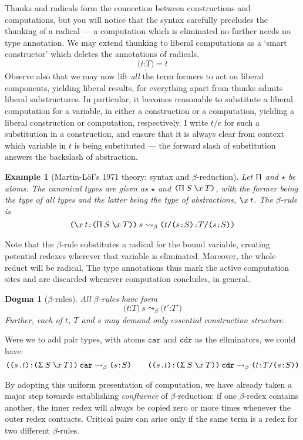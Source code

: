 \documentclass{jfp1}
\newtheorem{dogma}[theorem]{Dogma}
\newtheorem{example}[theorem]{Example}
\newcommand{\fsl}{\texttt{/}}
\newcommand{\Pa}[1]{\texttt{(}#1\texttt{)}}
\newcommand{\dt}{\texttt{.}}
\newcommand{\cn}[2]{\Pa{#1 \dt #2}}
\newcommand{\hb}{\texttt{:}}
\newcommand{\ra}[2]{\Pa{#1 \hb #2}}
\newcommand{\Ne}{\underline}
\begin{document}
Thunks and radicals form the connection between constructions and
computations, but you will notice that the syntax carefully precludes
the thunking of a radical --- a computation which is eliminated no
further needs no type annotation. We may extend thunking to liberal
computations as a `smart constructor' which deletes the annotations
of radicals.
\[
  \Ne{\ra tT} = t
\]
Observe also that we may now lift
\emph{all} the term formers to act on liberal components, yielding
liberal results, for everything apart from thunks admits
liberal substructures. In particular, it becomes reasonable to
substitute a liberal computation for a variable, in either a
construction or a computation, yielding a liberal construction or
computation, respectively. I write $t\fsl e$ for such a substitution
in a construction, and ensure that it is always clear from context
which variable in $t$ is being substituted --- the forward slash
of substitution answers the backslash of abstraction.

\newcommand{\U}{\ensuremath{\star}}

\begin{example}[Martin-L\"of's 1971 theory: syntax and $\beta$-reduction]
  Let $\Uppi$ and $\U$ be atoms. The canonical types are given as
  $\U$ and $\PI SxT$, with the former being the type of all types
  and the latter being the type of abstractions, $\la xt$. The
  $\beta$-rule is
\[
  \ra{\la xt}{\PI SxT}\:s \leadsto_\beta \ra{t\fsl\ra sS}{T\fsl\ra sS}
\]
\end{example}

Note that the $\beta$-rule substitutes a radical
for the bound variable, creating potential redexes wherever that
variable is eliminated. Moreover, the whole reduct will be radical. The type
annotations thus mark the active computation sites and are discarded
whenever computation concludes, in general.

\begin{dogma}[$\beta$-rules]
  All $\beta$-rules have form
  \[\ra tT\:s \leadsto_\beta \ra{t'}{T'}
  \]
  Further, each of $t$, $T$ and $s$ may demand only essential
  construction structure.
\end{dogma}

\newcommand{\car}{\texttt{car}} 
\newcommand{\cdr}{\texttt{cdr}} 
Were we to add pair types, with atoms $\car$ and $\cdr$ as the
eliminators, we could have:
\[\ra{\cn st}{\SG SxT}\:\car \leadsto_\beta \ra sS \qquad
  \ra{\cn st}{\SG SxT}\:\cdr \leadsto_\beta \ra t{T\fsl\ra sS}
\]

By adopting this uniform presentation of computation, we have already
taken a major step towards establishing \emph{confluence} of
$\beta$-reduction: if one $\beta$-redex contains another, the inner
redex will always be copied zero or more times whenever the outer redex
contracts. Critical pairs can arise only if the same term is a redex
for two different $\beta$-rules.
\end{document}
